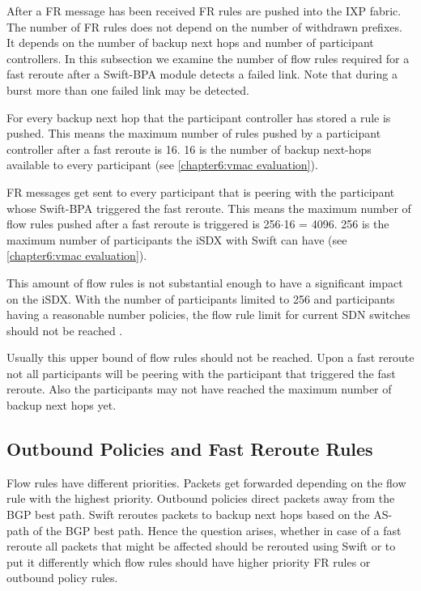 After a FR message has been received FR rules are pushed into the IXP fabric. The number of FR rules does not depend on the number of withdrawn prefixes. It depends on the number of backup next hops and number of participant controllers. 
In this subsection we examine the number of flow rules required for a fast reroute after a Swift-BPA module detects a failed link. Note that during a burst more than one failed link may be detected. 

For every backup next hop that the participant controller has stored a rule is pushed. This means the maximum number of rules pushed by a participant controller after a fast reroute is 16. 16 is the number of backup next-hops available to every participant (see \ref{chapter6:vmac evaluation}).

FR messages get sent to every participant that is peering with the participant whose Swift-BPA triggered the fast reroute. This means the maximum number of flow rules pushed after a fast reroute is triggered is 256$\cdot$16 = 4096. 256 is the maximum number of participants the iSDX with Swift can have (see \ref{chapter6:vmac evaluation}).

This amount of flow rules is not substantial enough to have a significant impact on the iSDX. With the number of participants limited to 256 and participants having a reasonable number policies, the flow rule limit for current SDN switches should not be reached \cite[Figure 3 (a)]{gupta2016industrial}.

Usually this upper bound of flow rules should not be reached. Upon a fast reroute not all participants will be peering with the participant that triggered the fast reroute. Also the participants may not have reached the maximum number of backup next hops yet.

\subsection{\label{chapter6:number of flow rules:outbound_FR}Outbound Policies and Fast Reroute Rules}

Flow rules have different priorities. Packets get forwarded depending on the flow rule with the highest priority. 
Outbound policies direct packets away from the BGP best path. Swift reroutes packets to backup next hops based on the AS-path of the BGP best path. Hence the question arises, whether in case of a fast reroute all packets that might be affected should be rerouted using Swift or to put it differently which flow rules should have higher priority FR rules or outbound policy rules.

